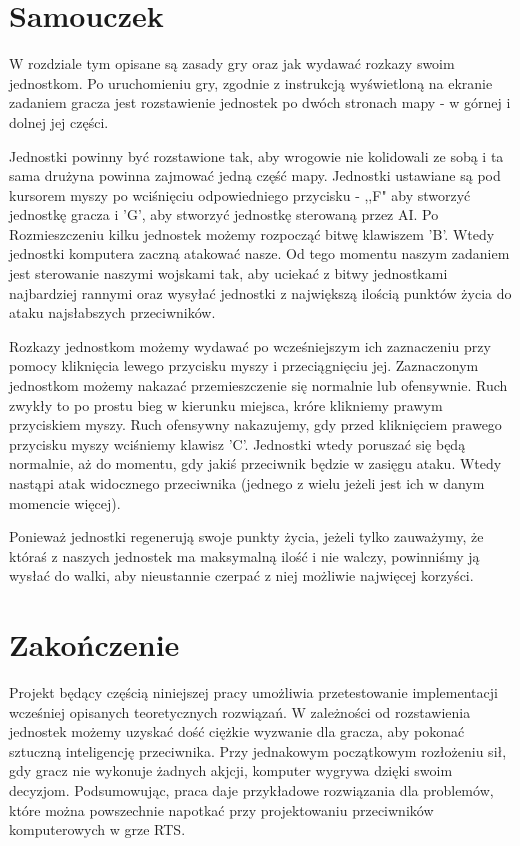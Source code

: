 \documentclass[12pt]{report}
\begin{document}
\section{Samouczek }
W rozdziale tym opisane są zasady gry oraz jak wydawać rozkazy swoim jednostkom.
Po uruchomieniu gry, zgodnie z instrukcją wyświetloną na ekranie zadaniem gracza jest rozstawienie jednostek po dwóch stronach mapy - w górnej i dolnej jej części. 

Jednostki powinny być rozstawione tak, aby wrogowie nie kolidowali ze sobą i ta sama drużyna powinna zajmować jedną część mapy. Jednostki ustawiane są pod kursorem myszy po wciśnięciu odpowiedniego przycisku - ,,F" aby stworzyć jednostkę gracza i 'G', aby stworzyć jednostkę sterowaną przez AI. Po Rozmieszczeniu kilku jednostek możemy rozpocząć bitwę klawiszem 'B'. Wtedy jednostki komputera zaczną atakować nasze. Od tego momentu naszym zadaniem jest sterowanie naszymi wojskami tak, aby uciekać z bitwy jednostkami najbardziej rannymi oraz wysyłać jednostki z największą ilością punktów życia do ataku najsłabszych przeciwników.

Rozkazy jednostkom możemy wydawać po wcześniejszym ich zaznaczeniu przy pomocy kliknięcia lewego przycisku myszy i przeciągnięciu jej. Zaznaczonym jednostkom możemy nakazać przemieszczenie się normalnie lub ofensywnie. Ruch zwykły to po prostu bieg w kierunku miejsca, króre klikniemy prawym przyciskiem myszy. Ruch ofensywny nakazujemy, gdy przed kliknięciem prawego przycisku myszy wciśniemy klawisz 'C'. Jednostki wtedy poruszać się będą normalnie, aż do momentu, gdy jakiś przeciwnik będzie w zasięgu ataku. Wtedy nastąpi atak widocznego przeciwnika (jednego z wielu jeżeli jest ich w danym momencie więcej).

Ponieważ jednostki regenerują swoje punkty życia, jeżeli tylko zauważymy, że któraś z naszych jednostek ma maksymalną ilość i nie walczy, powinniśmy ją wysłać do walki, aby nieustannie czerpać z niej możliwie najwięcej korzyści.

\section{Zakończenie}
Projekt będący częścią niniejszej pracy umożliwia przetestowanie implementacji wcześniej opisanych teoretycznych rozwiązań. W zależności od rozstawienia jednostek możemy uzyskać dość ciężkie wyzwanie dla gracza, aby pokonać sztuczną inteligencję przeciwnika. Przy jednakowym początkowym rozłożeniu sił, gdy gracz nie wykonuje żadnych akjcji, komputer wygrywa dzięki swoim decyzjom. Podsumowując, praca daje przykładowe rozwiązania dla problemów, które można powszechnie napotkać przy projektowaniu przeciwników komputerowych w grze RTS.
\end{document}
